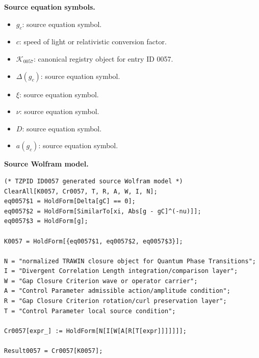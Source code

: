 \begin{minipage}[t]{0.49\linewidth}
\begingroup
\small
\raggedright
\textbf{Source equation symbols.}\par
\begin{itemize}[leftmargin=1.35em,itemsep=1pt,topsep=1pt,parsep=0pt]
    \item $g_{c}$: source equation symbol.
    \item $c$: speed of light or relativistic conversion factor.
    \item $\mathcal{K}_{0057}$: canonical registry object for entry ID 0057.
    \item $\Delta(g_{c})$: source equation symbol.
    \item $\xi$: source equation symbol.
    \item $\nu$: source equation symbol.
    \item $D$: source equation symbol.
    \item $a(g_{c})$: source equation symbol.
\end{itemize}
\endgroup
\end{minipage}\hfill
\begin{minipage}[t]{0.47\linewidth}
\begingroup
\scriptsize
\raggedright
\textbf{Source Wolfram model.}\par
\begin{Verbatim}[fontsize=\tiny,breaklines=true,breakanywhere=true]
(* TZPID ID0057 generated source Wolfram model *)
ClearAll[K0057, Cr0057, T, R, A, W, I, N];
eq0057$1 = HoldForm[Delta[gC] == 0];
eq0057$2 = HoldForm[SimilarTo[xi, Abs[g - gC]^(-nu)]];
eq0057$3 = HoldForm[g];

K0057 = HoldForm[{eq0057$1, eq0057$2, eq0057$3}];

N = "normalized TRAWIN closure object for Quantum Phase Transitions";
I = "Divergent Correlation Length integration/comparison layer";
W = "Gap Closure Criterion wave or operator carrier";
A = "Control Parameter admissible action/amplitude condition";
R = "Gap Closure Criterion rotation/curl preservation layer";
T = "Control Parameter local source condition";

Cr0057[expr_] := HoldForm[N[I[W[A[R[T[expr]]]]]]];

Result0057 = Cr0057[K0057];
\end{Verbatim}
\endgroup
\end{minipage}

